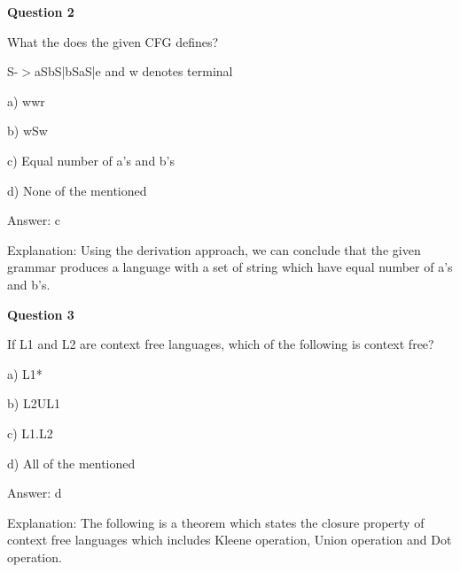 \documentclass{article}
\begin{document}
\begin{mdframed}[linewidth=1pt, roundcorner=5pt, linecolor=gray!30, backgroundcolor=gray!5]
\textbf{Question 2} 

What the does the given CFG defines?

S-$>$aSbS|bSaS|e and w denotes terminal

a) wwr

b) wSw

c) Equal number of a's and b's

d) None of the mentioned
\vspace{5pt} \par
\begin{tcolorbox}[colback=green!5, colframe=green!40!black, title=Solution]
Answer: c

Explanation: Using the derivation approach, we can conclude that the given grammar produces a language with a set of string which have equal number of a's and b's.
\end{tcolorbox}
\end{mdframed}

\begin{mdframed}[linewidth=1pt, roundcorner=5pt, linecolor=gray!30, backgroundcolor=gray!5]
\textbf{Question 3} 

If L1 and L2 are context free languages, which of the following is context free?

a) L1*

b) L2UL1

c) L1.L2

d) All of the mentioned
\vspace{5pt} \par
\begin{tcolorbox}[colback=green!5, colframe=green!40!black, title=Solution]
Answer: d

Explanation: The following is a theorem which states the closure property of context free languages which includes Kleene operation, Union operation and Dot operation.
\end{tcolorbox}
\end{mdframed}
\newpage
\end{document}
